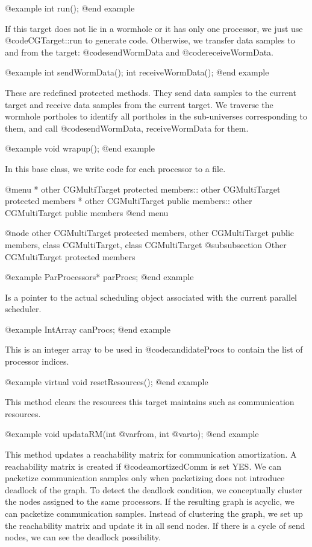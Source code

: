 @example
int run();
@end example

If this target does not lie in a wormhole or it has only one processor,
we just use @code{CGTarget::run} to generate code.
Otherwise, we transfer data samples to and from the target:
@code{sendWormData} and @code{receiveWormData}.

@example
int sendWormData();
int receiveWormData();
@end example

These are redefined protected methods. They send data samples to the current
target and receive data samples from the current target. We traverse the
wormhole portholes to identify all portholes in the sub-universes 
corresponding to them, and call @code{sendWormData, receiveWormData} for them.

@example
void wrapup();
@end example

In this base class, we write code for each processor to a file.
 
@menu
* other CGMultiTarget protected members:: other CGMultiTarget protected members
* other CGMultiTarget public members::	  other CGMultiTarget public members
@end menu

@node other CGMultiTarget protected members, other CGMultiTarget public members, class CGMultiTarget, class CGMultiTarget
@subsubsection Other CGMultiTarget protected members

@example
ParProcessors* parProcs;
@end example

Is a pointer to the actual scheduling object associated with the current
parallel scheduler.

@example
IntArray canProcs;
@end example

This is an integer array to be used in @code{candidateProcs} to contain
the list of processor indices.

@example
virtual void resetResources();
@end example

This method clears the resources this target maintains such as communication
resources.

@example
void updataRM(int @var{from}, int @var{to});
@end example

This method updates a reachability matrix for communication amortization.
A reachability matrix is created if @code{amortizedComm} is set YES.
We can packetize communication samples only when packetizing does not
introduce deadlock of the graph. To detect the deadlock condition, we
conceptually cluster the nodes assigned to the same processors. If the
resulting graph is acyclic, we can packetize communication samples.
Instead of clustering the graph, we set up the reachability matrix and
update it in all send nodes. If there is a cycle of send nodes, we can
see the deadlock possibility.

